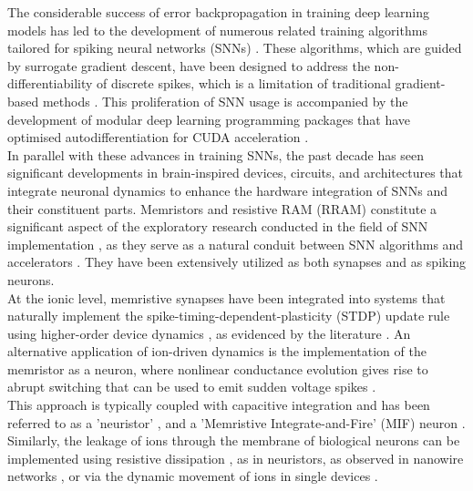 \noindent The considerable success of error backpropagation in training deep learning models has led to the development of numerous related training algorithms tailored for spiking neural networks (SNNs) \cite{werbos1990backpropagation}. These algorithms, which are guided by surrogate gradient descent, have been designed to address the non-differentiability of discrete spikes, which is a limitation of traditional gradient-based methods \cite{neftci2019surrogate}. This proliferation of SNN usage is accompanied by the development of modular deep learning programming packages \cite{hazan2018bindsnet} that have optimised autodifferentiation for CUDA acceleration \cite{pehle2021norse}. \\

\noindent In parallel with these advances in training SNNs, the past decade has seen significant developments in brain-inspired devices, circuits, and architectures that integrate neuronal dynamics to enhance the hardware integration of SNNs and their constituent parts. Memristors and resistive RAM (RRAM) constitute a significant aspect of the exploratory research conducted in the field of SNN implementation \cite{chua1971memristor}, as they serve as a natural conduit between SNN algorithms and accelerators \cite{chua1976memristive}. They have been extensively utilized as both synapses and as spiking neurons. \\

\noindent At the ionic level, memristive synapses have been integrated into systems that naturally implement the spike-timing-dependent-plasticity (STDP) update rule using higher-order device dynamics \cite{serrano2013stdp}, as evidenced by the literature \cite{lin2020adaptive}. An alternative application of ion-driven dynamics is the implementation of the memristor as a neuron, where nonlinear conductance evolution gives rise to abrupt switching that can be used to emit sudden voltage spikes \cite{lim2015reliability}.\\

\noindent This approach \cite{bao2019dual} is typically coupled with capacitive integration and has been referred to as a 'neuristor' \cite{del2020caloritronics}, and a 'Memristive Integrate-and-Fire' (MIF) neuron \cite{hao2020monolayer,kang2021build,zhou2022fully}. Similarly, the leakage of ions through the membrane of biological neurons can be implemented using resistive dissipation \cite{loeffler2021modularity}, as in neuristors, as observed in nanowire networks \cite{hochstetter2021avalanches,zhu2021mnist}, or via the dynamic movement of ions in single devices \cite{zhu2020memristor}. \\

